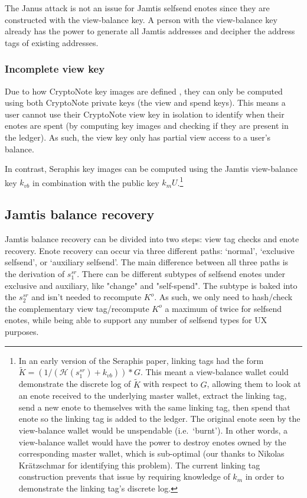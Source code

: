 The Janus attack is not an issue for Jamtis selfsend enotes since they are constructed with the view-balance key. A person with the view-balance key already has the power to generate all Jamtis addresses and decipher the address tags of existing addresses.

\subsubsection{Incomplete view key}
\label{subsubsec:jamtis-cryptonote-flaws-view-key}

Due to how CryptoNote key images are defined \cite{cryptoNoteWhitePaper}, they can only be computed using both CryptoNote private keys (the view and spend keys). This means a user cannot use their CryptoNote view key in isolation to identify when their enotes are spent (by computing key images and checking if they are present in the ledger). As such, the view key only has partial view access to a user's balance.

In contrast, Seraphis key images can be computed using the Jamtis view-balance key $k_{vb}$ in combination with the public key $k_m U$.\footnote{In an early version of the Seraphis paper, linking tags had the form $\tilde{K} = (1/(\mathcal{H}(s^{sr}_1) + k_{vb}))*G$. This meant a view-balance wallet could demonstrate the discrete log of $\tilde{K}$ with respect to $G$, allowing them to look at an enote received to the underlying master wallet, extract the linking tag, send a new enote to themselves with the same linking tag, then spend that enote so the linking tag is added to the ledger. The original enote seen by the view-balance wallet would be unspendable (i.e.\ `burnt'). In other words, a view-balance wallet would have the power to destroy enotes owned by the corresponding master wallet, which is sub-optimal (our thanks to Nikolas Kr{\"{a}}tzschmar for identifying this problem). The current linking tag construction prevents that issue by requiring knowledge of $k_m$ in order to demonstrate the linking tag's discrete log.}


\subsection{Jamtis balance recovery}
\label{subsec:jamtis-balance-recovery}

Jamtis balance recovery can be divided into two steps: view tag checks and enote recovery. Enote recovery can occur via three different paths: `normal', `exclusive selfsend', or `auxiliary selfsend'. The main difference between all three paths is the derivation of $s^{sr}_1$. There can be different subtypes of selfsend enotes under exclusive and auxiliary, like "change" and "self-spend". The subtype is baked into the $s^{sr}_2$ and isn't needed to recompute $K^o$. As such, we only need to hash/check the complementary view tag/recompute $K^o$ a maximum of twice for selfsend enotes, while being able to support any number of selfsend types for UX purposes.

